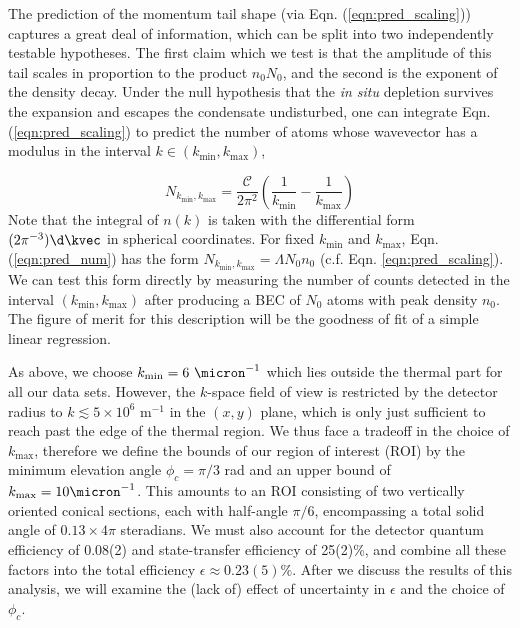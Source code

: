 	The prediction of the momentum tail shape (via Eqn. (\ref{eqn:pred_scaling})) captures a great deal of information, which can be split into two independently testable hypotheses. 
	The first claim which we test is that the amplitude of this tail scales in proportion to the product $n_0 N_0$, and the second is the exponent of the density decay.
	Under the null hypothesis that the \emph{in situ} depletion survives the expansion and escapes the condensate undisturbed, one can integrate Eqn. (\ref{eqn:pred_scaling}) to predict the number of atoms whose wavevector has a modulus in the interval $k\in (k_\textrm{min}, k_\textrm{max})$, 

	\begin{equation}
		N_{k_\textrm{min},k_\textrm{max}} =\frac{\mathcal{C}}{2\pi^2}\left(\frac{1}{k_\textrm{min}}-\frac{1}{k_\textrm{max}}\right)
		\label{eqn:pred_num}
	\end{equation}
	Note that the integral of $n(k)$ is taken with the differential form $(2\pi^{-3})\d\kvec$ in spherical coordinates.
	For fixed $k_\textrm{min}$ and $k_\textrm{max}$, Eqn. (\ref{eqn:pred_num}) has the form $N_{k_\textrm{min},k_\textrm{max}} = \Lambda N_0n_0$ (c.f. Eqn. \ref{eqn:pred_scaling}). 
	We can test this form directly by measuring the number of counts detected in the interval $(k_\textrm{min},k_\textrm{max})$ after producing a BEC of $N_0$ atoms with peak density $n_0$. 
	The figure of merit for this description will be the goodness of fit of a simple linear regression.
	
	As above, we choose $k_\textrm{min}=6~\micron^{-1}$ which lies outside the thermal part for all our data sets.
	However, the $k$-space field of view is restricted by the detector radius to $k\lesssim5\times 10^6$ m$^{-1}$ in the $(x,y)$ plane, which is only just sufficient to reach past the edge of the thermal region. 
	We thus face a tradeoff in the choice of $k_\textrm{max}$, therefore we define the bounds of our region of interest (ROI) by the minimum elevation angle $\phi_c=\pi/3$ rad and an upper bound of $k_\textrm{max} = 10\micron^{-1}$.
	This amounts to an ROI consisting of two vertically oriented conical sections, each with half-angle $\pi/6$, encompassing a total solid angle of $0.13\times 4\pi$ steradians. 
	We must also account for the detector quantum efficiency of 0.08(2) and state-transfer efficiency of 25(2)\%, and combine all these factors into the total efficiency $\epsilon\approx0.23(5)\%$.
	After we discuss the results of this analysis, we will  examine the (lack of) effect of uncertainty in $\epsilon$ and the choice of $\phi_c$.
	

